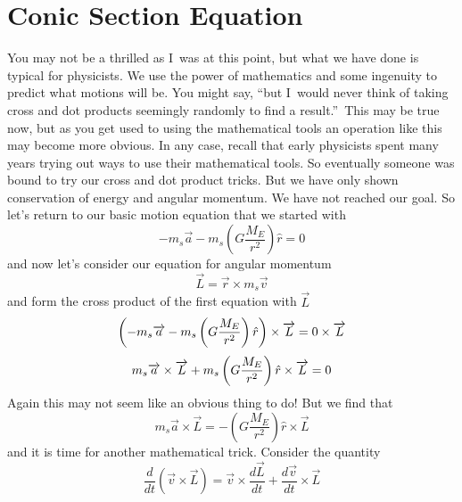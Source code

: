 \section{Conic Section Equation}
You may not be a thrilled as I\ was at this point, but what we have done is typical for physicists. We use the power of mathematics and some ingenuity to predict what motions will be. You might say, \textquotedblleft but I\  would never think of taking cross and dot products seemingly randomly to find a result.\textquotedblright\ This may be true now, but as you get used to using the mathematical tools an operation like this may become more obvious. In any case, recall that early physicists spent many years trying out ways to use their mathematical tools. So eventually someone was bound to try our cross and dot product tricks. But we have only shown conservation of energy and angular momentum. We have not reached our goal. So let's return to our basic motion equation that we started with 
\begin{equation*}
	-m_{s}\overrightarrow{a}-m_{s}\left( G\frac{M_{E}}{r^{2}}\right) \hat{r}=0 
\end{equation*}
and now let's consider our equation for angular momentum
\begin{equation*}
	\overrightarrow{L}=\overrightarrow{r}\times m_{s}\overrightarrow{v}
\end{equation*}
and form the cross product of the first equation with $\overrightarrow{L}$
\begin{equation*}
	\left( -m_{s}\overrightarrow{a}-m_{s}\left( G\frac{M_{E}}{r^{2}}\right) \hat{%
		r}\right) \times \overrightarrow{L}=0\times \overrightarrow{L}
\end{equation*}
\begin{equation*}
	m_{s}\overrightarrow{a}\times \overrightarrow{L}+m_{s}\left( G\frac{M_{E}}{%
		r^{2}}\right) \hat{r}\times \overrightarrow{L}=0 
\end{equation*}
Again this may not seem like an obvious thing to do! But we find that
\begin{equation*}
	m_{s}\overrightarrow{a}\times \overrightarrow{L}=-\left( G\frac{M_{E}}{r^{2}}%
	\right) \hat{r}\times \overrightarrow{L}
\end{equation*}
and it is time for another mathematical trick. Consider the quantity
\begin{equation*}
	\frac{d}{dt}\left( \overrightarrow{v}\times \overrightarrow{L}\right) =%
	\overrightarrow{v}\times \frac{d\overrightarrow{L}}{dt}+\frac{d%
		\overrightarrow{v}}{dt}\times \overrightarrow{L}
\end{equation*}
